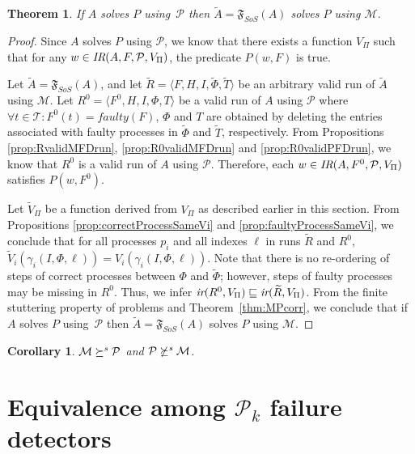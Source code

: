 \documentclass[11pt]{article}
\newtheorem{theorem}[proposition]{Theorem}
\newtheorem{corollary}[proposition]{Corollary}
\newcommand{\ident}[1]{\textit{#1}\rule{0cm}{1ex}}
\newcommand{\T}{\mathcal{T}}
\newcommand{\PFD}{\ensuremath{\mathcal{P}}}
\newcommand{\MFD}{\ensuremath{\mathcal{M}}}
\newcommand{\problem}{P} \newcommand{\Alg}{A}
\newcommand{\TrAlg}{\widetilde{A}}
\newcommand{\redSolv}{\succeq^{\ident{s}}}
\begin{document}
\begin{theorem} 
If $\Alg$ solves $\problem$ using~$\PFD$ then
     $ \TrAlg=\mathfrak{F}_{SoS}(A)$ solves $\problem$ using $\MFD$.
\end{theorem}
\begin{proof}
 Since  $\Alg$ solves $\problem$ using $\PFD$, we know that there exists a function $V_\Pi$ such that for any $w \in \ident{IR}(\Alg,F,\PFD,V_\Pi)$,  the predicate $P(w,F)$ is true.

Let $\TrAlg = \mathfrak{F}_{SoS}(\Alg)$, and let $\widetilde{R} =
     \langle F, H, I, \widetilde{\Phi}, \widetilde{T}\rangle$ be an
     arbitrary valid run of $\TrAlg$ using $\MFD$.
Let $R^0 = \langle F^0, H, I, \Phi, T\rangle$ be a valid run of $\Alg$
     using $\PFD$ where $\forall t \in \T: F^0(t) = faulty(F)$, $\Phi$
     and $T$ are obtained by deleting the entries associated with
     faulty processes in $\widetilde{\Phi}$ and $\widetilde{T}$,
     respectively.
From Propositions  \ref{prop:RvalidMFDrun}, \ref{prop:R0validMFDrun}
     and \ref{prop:R0validPFDrun}, we know that $R^0$ is a valid run
     of $\Alg$ using $\PFD$.
Therefore, each $w \in \ident{IR}(\Alg,F^0,\PFD,V_\Pi)$  satisfies
     $P(w,F^0)$.

Let $\widetilde{V}_\Pi$ be a function derived from $V_\Pi$ as
     described earlier in this section.
From Propositions \ref{prop:correctProcessSameVi} and
     \ref{prop:faultyProcessSameVi}, we conclude that  for all
     processes $p_i$ and all indexes $\ell$ in runs $\widetilde{R}$
     and $R^0$, $\widetilde{V}_i(\gamma_i(I,\Phi,\ell)) =
     V_i(\gamma_i(I,\Phi,\ell))$.
Note that there is no re-ordering of steps of correct processes
     between $\Phi$ and $\widetilde{\Phi}$; however, steps of faulty
     processes may be missing in $R^0$.
Thus, we infer $\ident{ir}(R^0,V_\Pi) \sqsubseteq
     \ident{ir}(\widetilde{R},V_\Pi)$.
From the finite stuttering property of problems and
     Theorem~\ref{thm:MPcorr}, we conclude that if $\Alg$ solves
     $\problem$ using~$\PFD$ then $ \TrAlg=\mathfrak{F}_{SoS}(A)$
     solves $\problem$ using $\MFD$.
\end{proof}


\begin{corollary}
$\MFD\redSolv\PFD$ and $\PFD\not\redSolv\MFD$.
\end{corollary}

\section{Equivalence among $\PFD_k$ failure detectors}
\label{sec:DK}
\end{document}
